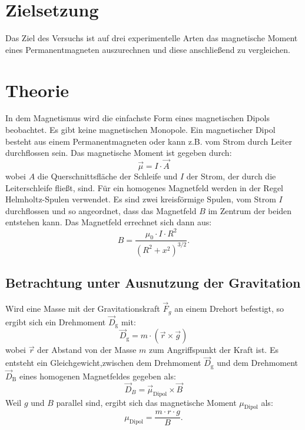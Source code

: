 \section{Zielsetzung}
Das Ziel des Versuchs ist auf drei experimentelle Arten das magnetische Moment eines Permanentmagneten auszurechnen und diese anschließend zu vergleichen. 
\section{Theorie}
In dem Magnetismus wird die einfachste Form eines magnetischen Dipols beobachtet. Es gibt keine magnetischen Monopole.
Ein magnetischer Dipol besteht aus einem Permanentmagneten oder kann z.B. vom Strom durch Leiter durchflossen sein. 
Das magnetische Moment ist gegeben durch:
\begin{equation}
\vec{\mu}=I\cdot\vec{A}
\end{equation}
wobei $A$ die Querschnittsfläche der Schleife und $I$ der Strom, der durch die Leiterschleife fließt, sind.
Für ein homogenes Magnetfeld werden in der Regel Helmholtz-Spulen verwendet. Es sind zwei kreisförmige Spulen, vom Strom $I$ durchflossen und so angeordnet, dass das Magnetfeld $B$ im Zentrum der beiden entstehen kann. 
Das Magnetfeld errechnet sich dann aus:
\begin{equation}
B=\frac{\mu_{0}\cdot I\cdot R^{2}}{(R^{2}+x^{2})^{3/2}}.
\label{eq:flussdichte}
\end{equation}
\subsection{Betrachtung unter Ausnutzung der Gravitation}
Wird eine Masse mit der Gravitationskraft $\vec{F}_{g}$ an einem Drehort befestigt, so ergibt sich ein Drehmoment $\vec{D}_{\text{g}}$ mit:
\begin{equation}
\vec{D}_{\text{g}}=m\cdot(\vec{r}\times\vec{g})
\end{equation}
wobei $\vec{r}$ der Abstand von der Masse $m$ zum  Angriffspunkt der Kraft ist.
Es entsteht ein Gleichgewicht,zwischen dem Drehmoment $\vec{D}_{\text{g}}$ und dem Drehmoment $\vec{D}_{\text{B}}$ eines homogenen Magnetfeldes gegeben als:
\begin{equation}
\vec{D}_{B}= \vec{\mu}_{\text{Dipol}} \times \vec{B}
\end{equation}
Weil $g$ und $B$ parallel sind, ergibt sich das magnetische Moment ${\mu_{\text{Dipol}}}$ als:
\begin{equation}
\mu_{\text{Dipol}}=\frac{m\cdot r\cdot g}{B}.
\label{eq:udipol}
\end{equation}
